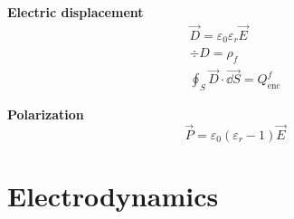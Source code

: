 \documentclass[10pt]{extarticle}
\numberwithin{equation}{section}
\begin{document}
\begin{multicols}{2}
	\textbf{Electric displacement}
	\begin{gather}
		\vec D = \varepsilon_0 \varepsilon_r \vec E \\
		\div D = \rho_f \\
		\oint_S \vec D \cdot \vec{\dd S} = Q_\text{enc}^f
	\end{gather}

	\textbf{Polarization}
	\begin{equation}
		\vec P = \varepsilon_0 (\varepsilon_r-1) \vec E
	\end{equation}

\end{multicols}

\section{Electrodynamics}
\end{document}
